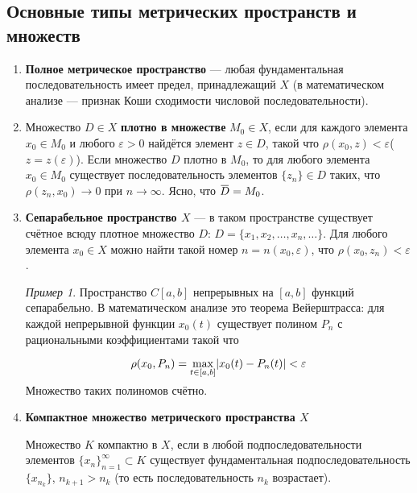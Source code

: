 \documentclass[12pt,a4paper,titlepage,oneside]{book}
\newcommand{\overbar}[1]{\mkern 1.5mu\overline{\mkern-1.5mu#1\mkern-1.5mu}\mkern 1.5mu}
\theoremstyle{definition}
\theoremstyle{plain}
\theoremstyle{remark}
\theoremstyle{remark}
\newtheorem*{example}{Пример}
\theoremstyle{remark}
\theoremstyle{remark}
\theoremstyle{plain}
\theoremstyle{plain}
\begin{document}
\subsection*{Основные типы метрических пространств и множеств}

\begin{enumerate}

	\item \textbf{Полное метрическое пространство} --- любая фундаментальная последовательность имеет предел, принадлежащий $X$ (в математическом анализе --- признак Коши сходимости числовой последовательности).

	\item Множество $D \in X$ \textbf{плотно в множестве} $ M_0 \in X$, если для каждого элемента $x_0 \in M_0$ и любого $\varepsilon > 0$ найдётся элемент $z \in D$, такой что $\rho(x_0, z) < \varepsilon$($z = z(\varepsilon)$). Если множество $D$ плотно в $M_0$, то для любого элемента $x_0 \in  M_0$ существует последовательность элементов $\lbrace z_n \rbrace \in D$ таких, что $\rho(z_n, x_0) \to 0$ при $n \to \infty$. Ясно, что $\overbar{D} = M_0$.

	\item \textbf{Сепарабельное пространство $X$} --- в таком пространстве существует счётное всюду плотное множество $D$: $D=\lbrace x_1,x_2,\ldots,x_n,\ldots \rbrace$. Для любого элемента $x_0 \in X$ можно найти такой номер $n = n(x_0,\varepsilon)$, что $\rho(x_0, z_n) < \varepsilon$.

	\begin{example}	
	Пространство $C[a,b]$ непрерывных на $[a,b]$ функций сепарабельно. В математическом анализе это теорема Вейерштрасса: для каждой непрерывной функции $x_0(t)$ существует полином $P_n$ с рациональными коэффициентами такой что
	
	\begin{equation*}
	\rho(x_0, P_n)=\smash{\displaystyle\max_{t \in [a,b]}} |x_0(t)-P_n(t)| < \varepsilon
	\end{equation*}

	Множество таких полиномов счётно.
	\end{example}

	\item \textbf{Компактное множество метрического пространства $X$}

	Множество $K$ компактно в $X$, если в любой подпоследовательности элементов $\lbrace x_n \rbrace_{n=1}^{\infty} \subset K$ существует фундаментальная подпоследовательность $\lbrace x_{n_k} \rbrace$, $n_{k+1}>n_k$ (то есть последовательность $n_k$ возрастает).

\end{enumerate}
\end{document}
